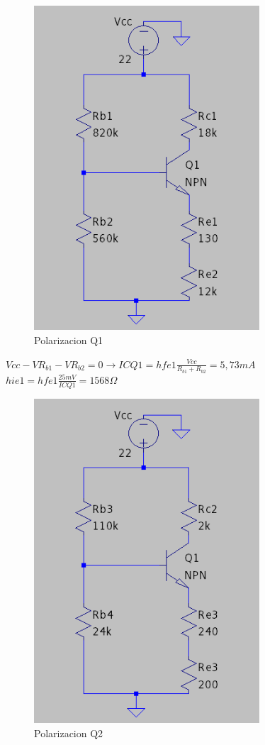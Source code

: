 \documentclass[12pt, letterpaper]{article}
\begin{document}
\begin{figure}[h]
	\centering
	\includegraphics[width=0.75\textwidth]{Imagenes/polarizacionQ1.png}
	\caption{Polarizacion Q1}
	\label{fig:2.4}
\end{figure}
$Vcc-VR_{b1}-VR_{b2}=0 \rightarrow ICQ1=hfe1\frac{Vcc}{R_{b1}+R_{b2}}=5,73mA$
\\
$hie1=hfe1\frac{25mV}{ICQ1}=1568\Omega$
\\
\begin{figure}[h]
	\centering
	\includegraphics[width=0.75\textwidth]{Imagenes/PolarizaQ2.png}
	\caption{Polarizacion Q2}
	\label{fig:2.5}
\end{figure}
\end{document}
